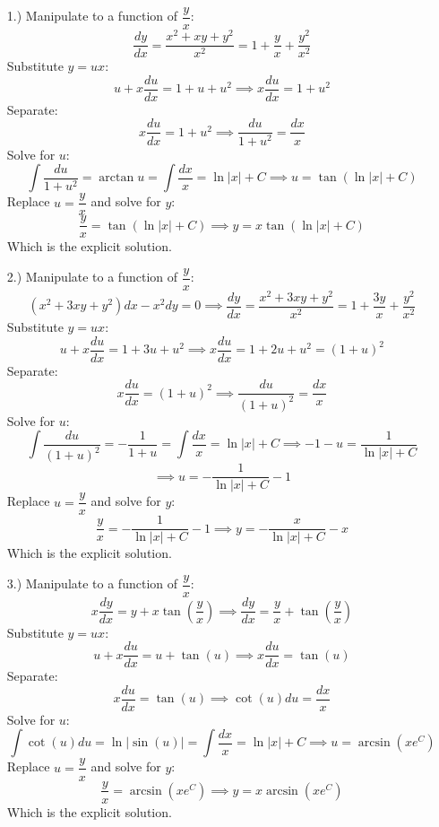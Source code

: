 \documentclass[12pt]{article}
\begin{document}
\pagestyle{fancy}
\fancyhead{}

\normalsize
\begin{itemize}
    \item [1.)] Manipulate to a function of $\dfrac{y}{x}$:
    \[\frac{dy}{dx}=\frac{x^2+xy+y^2}{x^2}=1+\frac{y}{x}+\frac{y^2}{x^2}\]
    Substitute $y=ux$:
    \[u+x\frac{du}{dx}=1+u+u^2\implies x\frac{du}{dx}=1+u^2\]
    Separate:
    \[x\frac{du}{dx}=1+u^2\implies\frac{du}{1+u^2}=\frac{dx}{x}\]
    Solve for $u$:
    \[\int\frac{du}{1+u^2}=\arctan{u}=\int\frac{dx}{x}=\ln\vert x\vert+C\implies u=\tan(\ln\vert x\vert+C)\]
    Replace $u=\dfrac{y}{x}$ and solve for $y$:
    \[\frac{y}{x}=\tan(\ln\vert x\vert+C)\implies y=x\tan(\ln\vert x\vert+C)\]
    Which is the explicit solution.

    \item [2.)] Manipulate to a function of $\dfrac{y}{x}$:
    \[(x^2+3xy+y^2)dx-x^2dy=0\implies\frac{dy}{dx}=\frac{x^2+3xy+y^2}{x^2}=1+\frac{3y}{x}+\frac{y^2}{x^2}\]
    Substitute $y=ux$:
    \[u+x\frac{du}{dx}=1+3u+u^2\implies x\frac{du}{dx}=1+2u+u^2=(1+u)^2\]
    Separate:
    \[x\frac{du}{dx}=(1+u)^2\implies\frac{du}{(1+u)^2}=\frac{dx}{x}\]
    Solve for $u$:
    \[\int\frac{du}{(1+u)^2}=-\frac{1}{1+u}=\int\frac{dx}{x}=\ln\vert x\vert+C\implies-1-u=\frac{1}{\ln\vert x\vert+C}\]
    \[\implies u=-\frac{1}{\ln\vert x\vert+C}-1\]
    Replace $u=\dfrac{y}{x}$ and solve for $y$:
    \[\frac{y}{x}=-\frac{1}{\ln\vert x\vert+C}-1\implies y=-\frac{x}{\ln\vert x\vert+C}-x\]
    Which is the explicit solution.

    \pagebreak
    \item [3.)] Manipulate to a function of $\dfrac{y}{x}$:
    \[x\frac{dy}{dx}=y+x\tan\left(\frac{y}{x}\right)\implies\frac{dy}{dx}=\frac{y}{x}+\tan\left(\frac{y}{x}\right)\]
    Substitute $y=ux$:
    \[u+x\frac{du}{dx}=u+\tan(u)\implies x\frac{du}{dx}=\tan(u)\]
    Separate:
    \[x\frac{du}{dx}=\tan(u)\implies\cot(u)du=\frac{dx}{x}\]
    Solve for $u$:
    \[\int\cot(u)du=\ln\vert\sin(u)\vert=\int\frac{dx}{x}=\ln\vert x\vert+C\implies u=\arcsin\left(xe^C\right)\]
    Replace $u=\dfrac{y}{x}$ and solve for $y$:
    \[\frac{y}{x}=\arcsin\left(xe^C\right)\implies y=x\arcsin\left(xe^C\right)\]
    Which is the explicit solution.

\end{itemize}
\end{document}
